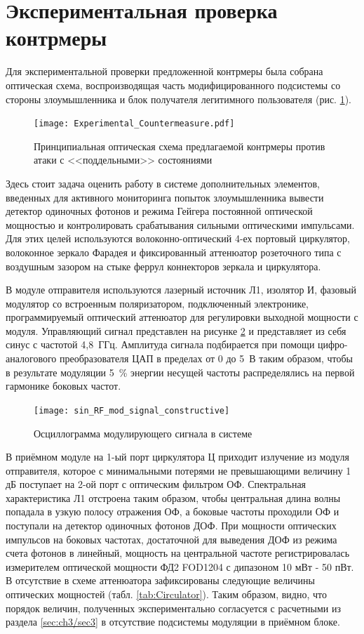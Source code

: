 \section{Экспериментальная проверка контрмеры} \label{ch:ch3/sec5}

Для экспериментальной проверки предложенной контрмеры была собрана оптическая схема, воспроизводящая часть модифицированного подсистемы со стороны злоумышленника и блок получателя легитимного пользователя (рис. \ref{fig:Experimental_countermeasure}). 


 \begin{figure}[ht]
  \centering
  \texttt{[image: Experimental\_Countermeasure.pdf]}
  \caption{Принципиальная оптическая схема предлагаемой контрмеры против атаки с <<поддельными>> состояниями}
  \label{fig:Experimental_countermeasure}
\end{figure}

Здесь стоит задача оценить работу в системе дополнительных элементов, введенных для активного мониторинга попыток злоумышленника вывести детектор одиночных фотонов и режима Гейгера постоянной оптической мощностью и контролировать срабатывания сильными оптическими импульсами. Для этих целей используются волоконно-оптический 4-ех портовый циркулятор, волоконное зеркало Фарадея и фиксированный аттенюатор розеточного типа с воздушным зазором на стыке феррул коннекторов зеркала и циркулятора. 

В модуле отправителя используются лазерный источник Л1, изолятор И, фазовый модулятор со встроенным поляризатором, подключенный электронике, программируемый оптический аттенюатор для регулировки выходной мощности с модуля. Управляющий сигнал представлен на рисунке \ref{fig:RF_sin_osc} и представляет из себя синус с частотой 4,8~ГГц. Амплитуда сигнала подбирается при помощи цифро-аналогового преобразователя ЦАП в пределах от 0 до 5~В таким образом, чтобы в результате модуляции 5~\% энергии несущей частоты распределялись на первой гармонике боковых частот.    


 \begin{figure}[ht]
  \centering
  \texttt{[image: sin\_RF\_mod\_signal\_constructive]}
  \caption{Осциллограмма модулирующего сигнала в системе}
  \label{fig:RF_sin_osc}
\end{figure}


В приёмном модуле на 1-ый порт циркулятора Ц приходит излучение из модуля отправителя, которое с минимальными потерями не превышающими величину 1 дБ поступает на 2-ой порт с оптическим фильтром ОФ. Спектральная характеристика Л1 отстроена таким образом, чтобы центральная длина волны попадала в узкую полосу отражения ОФ, а боковые частоты проходили ОФ и поступали на детектор одиночных фотонов ДОФ. При мощности оптических импульсов на боковых частотах, достаточной для выведения ДОФ из режима счета фотонов в линейный, мощность на центральной частоте регистрировалась измерителем оптической мощности ФД2 FOD1204 с дипазоном 10 мВт - 50 пВт. В отсутствие в схеме аттенюатора зафиксированы следующие величины оптических мощностей (табл. \ref{tab:Circulator}). Таким образом, видно, что порядок величин, полученных экспериментально согласуется с расчетными из раздела \ref{sec:ch3/sec3} в отсутствие подсистемы модуляции в приёмном блоке. 


